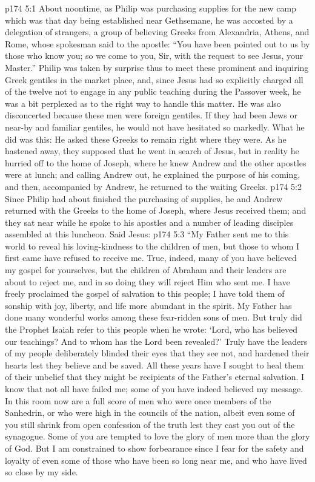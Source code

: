 \vs p174 5:1 About noontime, as Philip was purchasing supplies for the new camp which was that day being established near Gethsemane, he was accosted by a delegation of strangers, a group of believing Greeks from Alexandria, Athens, and Rome, whose spokesman said to the apostle: “You have been pointed out to us by those who know you; so we come to you, Sir, with the request to see Jesus, your Master.” Philip was taken by surprise thus to meet these prominent and inquiring Greek gentiles in the market place, and, since Jesus had so explicitly charged all of the twelve not to engage in any public teaching during the Passover week, he was a bit perplexed as to the right way to handle this matter. He was also disconcerted because these men were foreign gentiles. If they had been Jews or near\hyp{}by and familiar gentiles, he would not have hesitated so markedly. What he did was this: He asked these Greeks to remain right where they were. As he hastened away, they supposed that he went in search of Jesus, but in reality he hurried off to the home of Joseph, where he knew Andrew and the other apostles were at lunch; and calling Andrew out, he explained the purpose of his coming, and then, accompanied by Andrew, he returned to the waiting Greeks.
\vs p174 5:2 Since Philip had about finished the purchasing of supplies, he and Andrew returned with the Greeks to the home of Joseph, where Jesus received them; and they sat near while he spoke to his apostles and a number of leading disciples assembled at this luncheon. Said Jesus:
\vs p174 5:3 \pc \textcolor{ubdarkred}{“My Father sent me to this world to reveal his loving\hyp{}kindness to the children of men, but those to whom I first came have refused to receive me. True, indeed, many of you have believed my gospel for yourselves, but the children of Abraham and their leaders are about to reject me, and in so doing they will reject Him who sent me. I have freely proclaimed the gospel of salvation to this people; I have told them of sonship with joy, liberty, and life more abundant in the spirit. My Father has done many wonderful works among these fear\hyp{}ridden sons of men. But truly did the Prophet Isaiah refer to this people when he wrote: ‘Lord, who has believed our teachings? And to whom has the Lord been revealed?’ Truly have the leaders of my people deliberately blinded their eyes that they see not, and hardened their hearts lest they believe and be saved. All these years have I sought to heal them of their unbelief that they might be recipients of the Father’s eternal salvation. I know that not all have failed me; some of you have indeed believed my message. In this room now are a full score of men who were once members of the Sanhedrin, or who were high in the councils of the nation, albeit even some of you still shrink from open confession of the truth lest they cast you out of the synagogue. Some of you are tempted to love the glory of men more than the glory of God. But I am constrained to show forbearance since I fear for the safety and loyalty of even some of those who have been so long near me, and who have lived so close by my side.}
